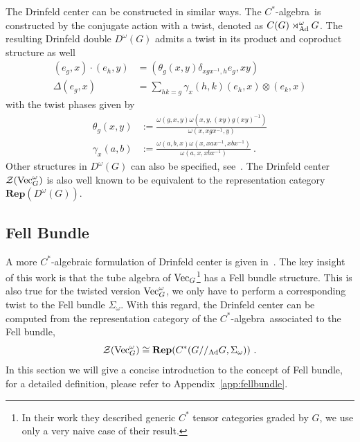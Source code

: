 \documentclass[a4paper,11pt]{article}
\newcommand{\Rep}{\textbf{Rep}}
\newcommand{\be}{\begin{equation}}
\newcommand{\ee}{\end{equation}}
\newcommand{\ba}{\begin{aligned}}
\newcommand{\ea}{\end{aligned}}
\def\CZ{\mathcal{Z}}
\def\calg{$C^*$-algebra\ }
\def\vecg{{\rm Vec}_G}
\def\vecgo{{\rm Vec}_G^\omega}
\begin{document}
The Drinfeld center can be constructed in similar ways. The \calg is constructed by the conjugate action with a twist, denoted as $C(G)\rtimes^\omega_{\rm Ad} G$. The resulting Drinfeld double $D^\omega(G)$ admits a twist in its product and coproduct structure as well~\cite{Roche:1990hs}
\be\ba
 \left(e_g, x\right) \cdot\left(e_h, y\right) &=\left(\theta_g(x,y)\delta_{x g x^{-1}, h} e_g, x y\right) \\
 \Delta\left(e_g, x\right) &=\sum_{h k=g} \gamma_x(h,k)\left(e_h, x\right) \otimes\left(e_k, x\right)
\ea\ee
with the twist phases given by
\be\begin{aligned}
\theta_g(x, y) & :=\frac{\omega(g, x, y) \omega\left(x, y, (xy)g(xy)^{-1} \right)}{\omega\left(x, xgx^{-1}, y\right)} \\
\gamma_x(a, b) & :=\frac{\omega(a, b, x) \omega\left(x, xax^{-1},  xbx^{-1}\right)}{\omega\left(a, x,  xbx^{-1}\right)} \ .
\end{aligned}\ee
Other structures in $D^\omega (G)$ can also be specified, see~\cite{Gruen:2021afw}. The Drinfeld center $\CZ(\vecgo)$ is also well known to be equivalent to the representation category $\Rep(D^\omega(G))$.


\subsection{Fell Bundle}\label{sec:fellbundle}
A more $C^*$-algebraic formulation of Drinfeld center is given in~\cite{Bhowmick:2018}. The key insight of this work is that the tube algebra of $\vecg$\footnote{In their work they described generic $C^*$ tensor categories graded by $G$, we use only a very naive case of their result.} has a Fell bundle structure. This is also true for the twisted version $\vecgo$, we only have to perform a corresponding twist to the Fell bundle $\Sigma_\omega$. With this regard, the Drinfeld center can be computed from the representation category of the \calg associated to the Fell bundle,
\be\label{eq:centertofellbundle} \CZ(\vecgo) \cong \Rep( C^*(G//_{\rm Ad}G , \Sigma_\omega) )  \ . \ee
In this section we will give a concise introduction to the concept of Fell bundle, for a detailed definition, please refer to Appendix~\ref{app:fellbundle}.
\end{document}
